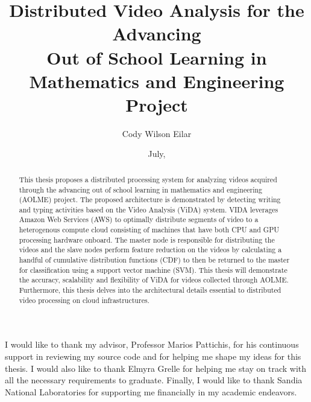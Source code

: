 \documentclass[botnum, fleqn]{unmeethesis}
\begin{document}
  \frontmatter



  \title{Distributed Video Analysis for the  Advancing  \\
  Out of School Learning in Mathematics and Engineering Project}

  \author{Cody Wilson Eilar}
  \date{July, \thisyear}

  \maketitle



  \begin{acknowledgments}
    \vspace{1.1in}
    I would like to thank my advisor, Professor Marios Pattichis, for his
    continuous support in reviewing my source code and for helping me shape my
    ideas for this thesis. I would also like to thank Elmyra Grelle for helping
    me stay on track with all the necessary requirements to graduate. Finally, I
    would like to thank Sandia National Laboratories for supporting me
    financially in my academic endeavors.
  \end{acknowledgments}

  \maketitleabstract %

  \begin{abstract}
    This thesis proposes a distributed processing system for analyzing
    videos acquired through the advancing out of school learning in
    mathematics and engineering (AOLME) project. The
    proposed architecture is demonstrated by detecting writing and typing
    activities based on the Video Analysis (ViDA) system. VIDA
    leverages Amazon Web Services (AWS) to optimally distribute segments of
    video to a heterogenous compute cloud consisting of machines that have both
    CPU and GPU processing hardware onboard. The master node is responsible for
    distributing the videos and the slave nodes perform feature reduction on the
    videos by calculating a handful of cumulative distribution functions (CDF)
    to then be returned to the master for classification using a support vector
    machine (SVM). This thesis will demonstrate the accuracy,
    scalability and flexibility of ViDA for videos collected through AOLME. Furthermore,
    this thesis delves into the architectural details essential to distributed
    video processing on cloud infrastructures.

    \clearpage %
  \end{abstract}
\end{document}
